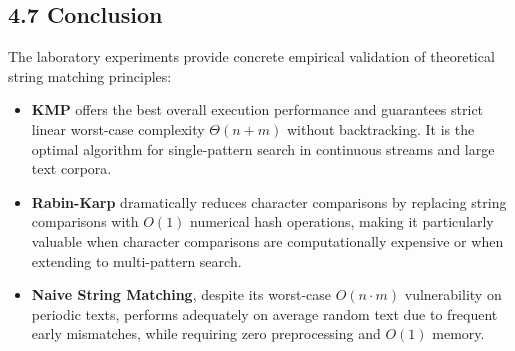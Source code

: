 \documentclass[12pt]{article}
\begin{document}
\subsection*{4.7 Conclusion}
The laboratory experiments provide concrete empirical validation of theoretical string matching principles:
\begin{itemize}
    \item \textbf{KMP} offers the best overall execution performance and guarantees strict linear worst-case complexity $\Theta(n + m)$ without backtracking. It is the optimal algorithm for single-pattern search in continuous streams and large text corpora.
    \item \textbf{Rabin-Karp} dramatically reduces character comparisons by replacing string comparisons with $O(1)$ numerical hash operations, making it particularly valuable when character comparisons are computationally expensive or when extending to multi-pattern search.
    \item \textbf{Naive String Matching}, despite its worst-case $O(n \cdot m)$ vulnerability on periodic texts, performs adequately on average random text due to frequent early mismatches, while requiring zero preprocessing and $O(1)$ memory.
\end{itemize}
\end{document}
